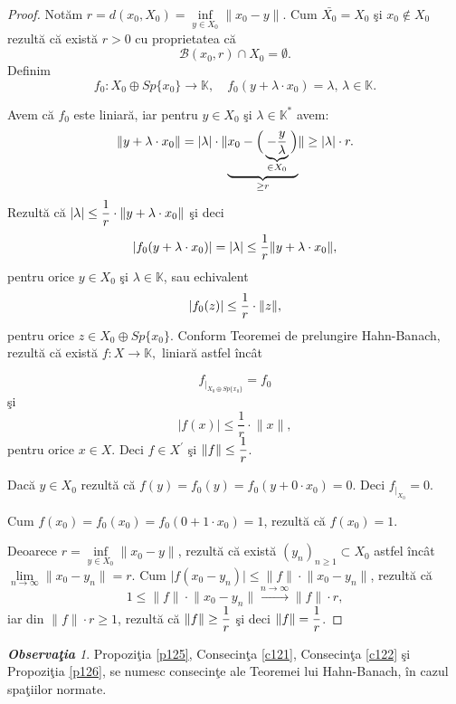 \documentclass[ a4paper, 12pt]{report}
\theoremstyle{definition}
\theoremstyle{remark}
\newtheorem{obs}{\bf Observa\c tia }[section]
\numberwithin{equation}{section}
\begin{document}
\begin{proof}
Not\u am $r = d(x_0,X_0) = \inf\limits_{y \in X_0} \lVert x_0 - y \rVert$. Cum $\bar{X_0} = X_0$ \c si $x_0 \notin X_0$ rezult\u a c\u a exist\u a $r>0$ cu proprietatea c\u a
$$\mathcal{B}(x_0,r) \cap X_0 = \emptyset.$$
Definim
$$f_0 : X_0 \oplus Sp\{x_0\} \rightarrow \mathbb{K},\quad  f_0(y + \lambda \cdot x_0) = \lambda, \, \lambda \in \mathbb{K}.$$

Avem c\u a $f_0$ este liniar\u a, iar pentru $y \in X_0$ \c si $\lambda \in \mathbb{K}^{\ast}$ avem:
$$\lVert  y + \lambda \cdot x_0 \rVert = \lvert \lambda \rvert \cdot \lVert \underbrace{ x_0 - \Big(\underbrace{-\displaystyle\frac{y}{\lambda}}_{\in X_0}\Big)}_{\geq r} \rVert \geq \lvert \lambda \rvert \cdot r.$$
Rezult\u a c\u a $\lvert \lambda \rvert \leq \displaystyle\frac{1}{r} \cdot \lVert y+\lambda \cdot x_0 \rVert$ \c si deci
$$\lvert f_0(y + \lambda \cdot x_0) \rvert = \lvert \lambda \rvert \leq \displaystyle\frac{1}{r}\lVert y + \lambda \cdot x_0  \rVert,$$ pentru orice $y \in X_0$ \c si $\lambda \in \mathbb{K}$, sau echivalent  $$\lvert f_0(z) \rvert \leq \displaystyle\frac{1}{r} \cdot \lVert z \rVert,$$ pentru orice $z \in X_0 \oplus Sp\{x_0\}$. Conform Teoremei de prelungire Hahn-Banach, rezult\u a c\u a exist\u a  $f : X \rightarrow \mathbb{K},$ liniar\u a astfel \^inc\^at

$$f_{|_{X_0 \oplus Sp\{ x_0 \}}} = f_0$$ \c si
$$\lvert f(x) \rvert \leq \frac{1}{r} \cdot \lVert x \rVert,$$ pentru orice $x \in X$. Deci $f \in X^{'}$ \c si $\lVert f  \rVert \leq \displaystyle\frac{1}{r}$.

Dac\u a $y \in X_0$ rezult\u a c\u a $f(y) = f_0(y) = f_0(y + 0 \cdot x_0) = 0$. Deci $f_{|_{X_0}} = 0$.

Cum $f(x_0) = f_0(x_0) = f_0(0 + 1 \cdot x_0) = 1$, rezult\u a  c\u a $f(x_0) = 1$.

Deoarece $r = \inf\limits_{y \in X_0} \lVert x_0 - y  \rVert$, rezult\u a c\u a exist\u a $(y_n)_{n \geq 1} \subset X_0$ astfel \^inc\^at $\lim\limits_{n \to \infty}\lVert x_0 - y_n \rVert = r$. Cum  $\lvert f(x_0 - y_n)  \rvert \leq \lVert f  \rVert \cdot \lVert x_0 - y_n \rVert$, rezult\u a c\u a
$$1 \leq \lVert f \rVert \cdot \lVert x_0 - y_n \rVert \stackrel{n \rightarrow \infty}{\longrightarrow} \lVert f  \rVert \cdot r,$$ iar din $\lVert f \rVert \cdot r \geq 1$, rezult\u a c\u a $\lVert f \rVert \geq \displaystyle\frac{1}{r}$ \c si deci $\lVert f \rVert = \displaystyle\frac{1}{r}$.
\end{proof}

\begin{obs}
Propozi\c tia \ref{p125}, Consecin\c ta \ref{c121}, Consecin\c ta \ref{c122} \c si Propozi\c tia \ref{p126}, se numesc consecin\c te ale Teoremei lui Hahn-Banach, \^in cazul spa\c tiilor normate.
\end{obs}
\end{document}
